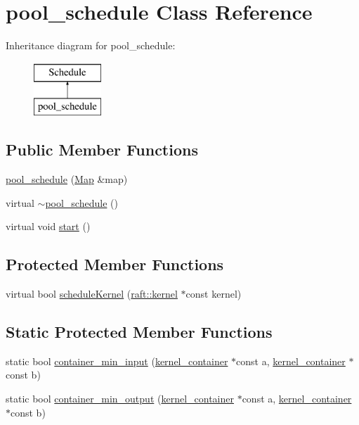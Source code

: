 \hypertarget{classpool__schedule}{}\section{pool\+\_\+schedule Class Reference}
\label{classpool__schedule}
Inheritance diagram for pool\+\_\+schedule\+:\begin{figure}[H]
\begin{center}
\leavevmode
\includegraphics[height=2.000000cm]{classpool__schedule}
\end{center}
\end{figure}
\subsection*{Public Member Functions}
\begin{DoxyCompactItemize}
\item 
\hyperlink{classpool__schedule_a11da62ac9c7b4ea203198ac3bb7babb4}{pool\+\_\+schedule} (\hyperlink{class_map}{Map} \&map)
\item 
virtual \hyperlink{classpool__schedule_a176ca5ea8ee742192b52660ecccc9290}{$\sim$pool\+\_\+schedule} ()
\item 
virtual void \hyperlink{classpool__schedule_ab67558a44404e42ba032f799c0f424a7}{start} ()
\end{DoxyCompactItemize}
\subsection*{Protected Member Functions}
\begin{DoxyCompactItemize}
\item 
virtual bool \hyperlink{classpool__schedule_aa5ec97e860a94aa17f33a0562fe942ce}{schedule\+Kernel} (\hyperlink{classraft_1_1kernel}{raft\+::kernel} $\ast$const kernel)
\end{DoxyCompactItemize}
\subsection*{Static Protected Member Functions}
\begin{DoxyCompactItemize}
\item 
static bool \hyperlink{classpool__schedule_a962f811570635fb9a9ec13c1bbcf2923}{container\+\_\+min\+\_\+input} (\hyperlink{classkernel__container}{kernel\+\_\+container} $\ast$const a, \hyperlink{classkernel__container}{kernel\+\_\+container} $\ast$const b)
\item 
static bool \hyperlink{classpool__schedule_a9cef61efbff4cd4f0b2834fa1d8448cd}{container\+\_\+min\+\_\+output} (\hyperlink{classkernel__container}{kernel\+\_\+container} $\ast$const a, \hyperlink{classkernel__container}{kernel\+\_\+container} $\ast$const b)
\end{DoxyCompactItemize}
